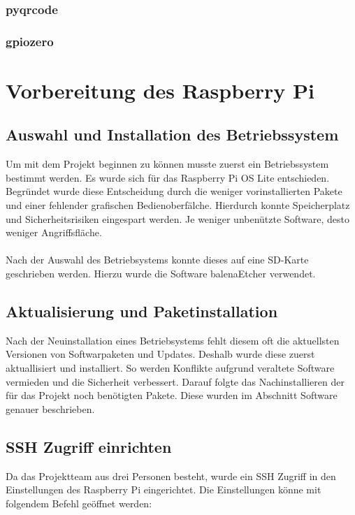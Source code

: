 \documentclass[a4paper,11pt,singlespacing]{article}
\begin{document}
    			\subsubsection{pyqrcode}
    			\subsubsection{gpiozero}
    	
    	
    	\section{Vorbereitung des Raspberry Pi}
    	\subsection{Auswahl und Installation des Betriebssystem}
    	Um mit dem Projekt beginnen zu können musste zuerst ein Betriebssystem bestimmt werden.
    	Es wurde sich für das Raspberry Pi OS Lite entschieden. Begründet wurde diese Entscheidung  durch die weniger vorinstallierten Pakete und einer fehlender grafischen Bedienoberfälche. Hierdurch konnte Speicherplatz und Sicherheitsrisiken eingespart werden. Je weniger unbenützte Software, desto weniger Angriffsfläche. \\ \\
    	
    	Nach der Auswahl des Betriebsystems konnte dieses auf eine SD-Karte geschrieben werden.
    	Hierzu wurde die Software balenaEtcher verwendet.   
    	
    	
    	\subsection{Aktualisierung und Paketinstallation}
    	Nach der Neuinstallation eines Betriebsystems fehlt diesem oft die aktuellsten Versionen von Softwarpaketen und Updates. Deshalb wurde diese zuerst aktuallisiert und installiert. So werden Konflikte aufgrund veraltete Software vermieden und die Sicherheit verbessert.  
    	Darauf folgte das Nachinstallieren der für das Projekt noch benötigten Pakete. Diese wurden im Abschnitt Software genauer beschrieben. 
    	
    	
    	\subsection{SSH Zugriff einrichten}
    	Da das Projektteam aus drei Personen besteht, wurde ein SSH Zugriff in den Einstellungen des Raspberry Pi eingerichtet. Die Einstellungen könne mit folgendem Befehl geöffnet werden: 
\end{document}

